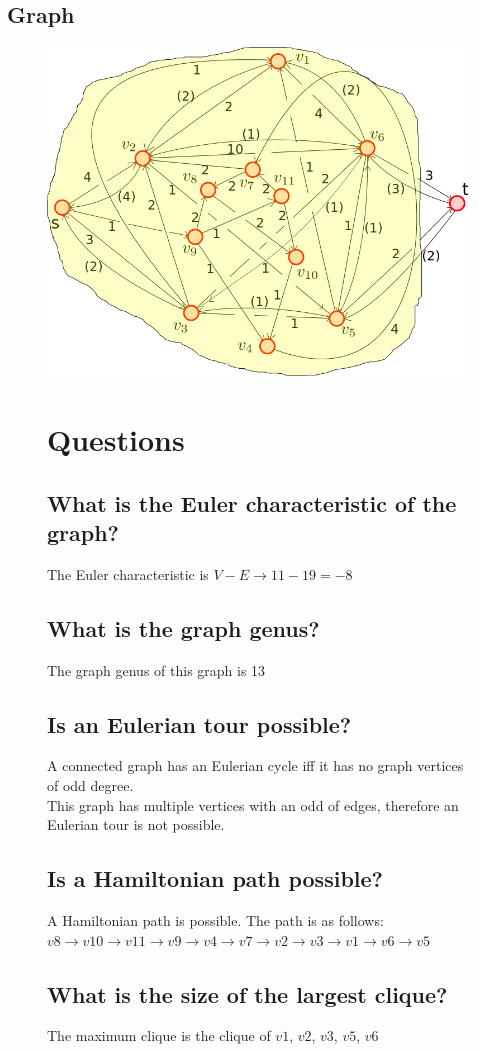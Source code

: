 \documentclass[10pt,letterpaper]{article}
\begin{document}
\subsection{Graph}
\begin{figure}[h]
	\includegraphics[scale = .5]{graph.png}
\section{Questions}
\subsection{What is the Euler characteristic of the graph?}
The Euler characteristic is $V - E \rightarrow 11 - 19 = -8$ 
\subsection{What is the graph genus?}
The graph genus of this graph is 13
\subsection{Is an Eulerian tour possible?}
A connected graph has an Eulerian cycle iff it has no graph vertices of odd degree.\\
This graph has multiple vertices with an odd of edges, therefore an Eulerian tour is not possible.

\subsection{Is a Hamiltonian path possible?}
A Hamiltonian path is possible. The path is as follows:\\
$v8 \rightarrow v10 \rightarrow v11 \rightarrow v9 \rightarrow v4 \rightarrow v7 \rightarrow v2 \rightarrow v3 \rightarrow v1 \rightarrow v6 \rightarrow v5$

\subsection{What is the size of the largest clique?}
The maximum clique is the clique of $v1$, $v2$, $v3$, $v5$, $v6$

\end{figure}
\end{document}
